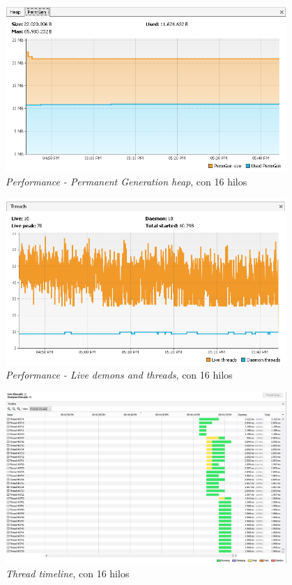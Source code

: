 \begin{figure}[H]
\centering
\includegraphics[width=0.95\textwidth]{images/Performance_PERM_16_Threads}
\caption{\emph{Performance - Permanent Generation heap}, con 16 hilos}
\label{fig:6.25}
\end{figure}

\begin{figure}[H]
\centering
\includegraphics[width=0.95\textwidth]{images/Performance_LIVE_16_Threads}
\caption{\emph{Performance - Live demons and threads}, con 16 hilos}
\label{fig:6.26}
\end{figure}

\begin{figure}[H]
\centering
\includegraphics[width=0.95\textwidth]{images/Running_Time_16_Threads}
\caption{\emph{Thread timeline}, con 16 hilos}
\label{fig:6.27}
\end{figure}

